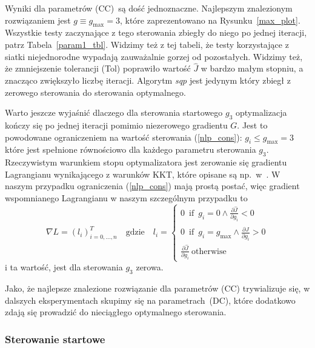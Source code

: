 \documentclass[11pt]{article}
\def\iif{\operatorname{if}}
\begin{document}
Wyniki dla parametrów (CC)\ są dość jednoznaczne. Najlepszym znalezionym rozwiązaniem jest $g \equiv g_{\max} = 3$, które zaprezentowano na Rysunku~\ref{max_plot}. Wszystkie testy zaczynające z tego sterowania zbiegły do niego po jednej iteracji, patrz Tabela~\ref{param1_tbl}.  Widzimy też z tej tabeli, że testy korzystające z siatki niejednorodne wypadają zauważalnie gorzej od pozostałych. Widzimy też, że zmniejszenie tolerancji (Tol) poprawiło wartość $\hat{J}$ w bardzo małym stopniu, a znacząco zwiększyło liczbę iteracji. Algorytm {\it sqp\/} jest jedynym który zbiegł z zerowego sterowania do sterowania optymalnego.

Warto jeszcze wyjaśnić dlaczego dla sterowania startowego $g_3$ optymalizacja kończy się po jednej iteracji pomimio niezerowego gradientu $G$. Jest to powodowane ograniczeniem na wartość sterowania (\ref{nlp_cons}): $g_i \le g_{\max} = 3$ które jest spełnione równościowo dla każdego parametru sterowania $g_3$. Rzeczywistym warunkiem stopu optymalizatora jest zerowanie się gradientu Lagrangianu wynikającego z warunków KKT, które opisane są np.\ w~\cite{kuhn1951}. W naszym przypadku ograniczenia (\ref{nlp_cons}) mają prostą postać, więc gradient wspomnianego Lagrangianu w naszym szczególnym przypadku to
\begin{equation}\label{lagrangian}
  \nabla L = {(l_i)}^T_{i = 0,\ldots, n} \quad \text{gdzie} \quad
  l_i = \begin{cases}
    0\ \iif\ g_i = 0 \land \frac{\partial \hat{J}}{\partial g_i} < 0 \\
    0\ \iif\ g_i = g_{\max} \land \frac{\partial \hat{J}}{\partial g_i} > 0 \\
    \frac{\partial \hat{J}}{\partial g_i}\ \text{otherwise}
  \end{cases}
\end{equation}
i ta wartość, jest dla sterowania $g_3$ zerowa.

Jako, że najlepsze znalezione rozwiązanie dla parametrów (CC) trywializuje się, w dalszych eksperymentach skupimy się na parametrach~(DC), które dodatkowo zdają się prowadzić do nieciągłego optymalnego sterowania.

\subsubsection{Sterowanie startowe}
\end{document}
